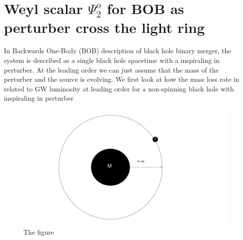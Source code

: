 \documentclass[prd,preprintnumbers,onecolumn,eqsecnum,floatfix,letter]{revtex4}
\begin{document}
\section{ Weyl scalar $\Psi^{o}_{2}$ for BOB as perturber cross the light ring }
In Backwards One-Body (BOB) \cite{McWilliams_2019} description of black hole binary merger, the system is described as a single black hole spacetime with a inspiraling in perturber. At the leading order we can just assume that the mass of the perturber and the source is evolving. We first look at how the mass loss rate in related to GW luminosity at leading order for a non-spinning black hole with inspiraling in perturber
\begin{figure}
	\includegraphics[width=5.5in]{../plots/BOB.pdf}
	\caption{The figure}
	\label{fig:BoBFig}
\end{figure} 
\end{document}
